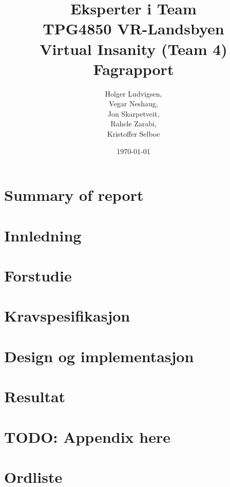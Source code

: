 \documentclass[12pt]{report}
\title{{\Large Eksperter i Team\\TPG4850 VR-Landsbyen\\{\bf Virtual Insanity (Team 4)\\Fagrapport}}}
\author{Holger Ludvigsen,\\Vegar Neshaug,\\Jon Skarpetveit,\\Rahele Zarabi,\\Kristoffer Selboe}
\date{{\small \today}}
\begin{document}
\maketitle


\chapter{Summary of report}
	
\pagebreak
	
\setlength{\parskip}{0.0in}
\tableofcontents
\listoftables
\listoffigures

\pagebreak
\setlength{\parskip}{0.1in}

\setcounter{page}{1} %

\chapter{Innledning}

	

\chapter{Forstudie}

	

\chapter{Kravspesifikasjon}

	
	
\chapter{Design og implementasjon}

	

\chapter{Resultat}

	

\appendix

	\chapter{TODO: Appendix here}

\pagestyle{plain}
\pagebreak
{}
\setcounter{page}{1} %

\chapter{Ordliste}

	

	

\end{document}
